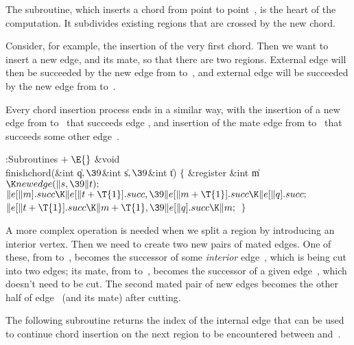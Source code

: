 The  subroutine, which inserts a
chord from point  to
point~, is the heart of the computation. It subdivides existing regions
that are crossed by the new chord.

Consider, for example, the insertion of the very first chord. Then
we want to insert a new edge, and its mate, so that there are two regions.
External edge  will then be succeeded by the new edge from  to~,
and external edge  will be succeeded by the new edge from  to~.

Every chord insertion process ends in a similar way, with the
insertion of a new edge from  to~ that succeeds edge ,
and insertion of the mate edge from  to~ that succeeds some
other edge~.

\Y\B\4:Subroutines\X${}\mathrel+\E{}$\6
\&{void} \\{finishchord}(\&{int} \|q${},\39{}$\&{int} \|s${},\39{}$\&{int} \|t)%
\1\1\2\2\6
${}\{{}$\1\6
\&{register} \&{int} \|m${}\K\\{newedge}(\|s,\39\|t);{}$\7
${}\|e[\|m].\\{succ}\K\|e[\|t+\T{1}].\\{succ},\39\|e[\|m+\T{1}].\\{succ}\K\|e[%
\|q].\\{succ};{}$\6
${}\|e[\|t+\T{1}].\\{succ}\K\|m+\T{1},\39\|e[\|q].\\{succ}\K\|m;{}$\6
\4${}\}{}$\2\par
\fi

A more complex operation is needed when we split a
region by introducing
an interior vertex. Then we need to create two new pairs of mated edges.
One of these, from  to~, becomes the successor of some
{\it interior\/} edge~, which is being cut into two edges; its mate,
from  to~, becomes the successor of a given edge~,
which
doesn't need to be cut. The second mated pair of new edges becomes
the other half of edge~ (and its mate) after cutting.

The following subroutine returns the index of the internal edge that
can be used to continue chord insertion on the next region to be
encountered between  and~.

